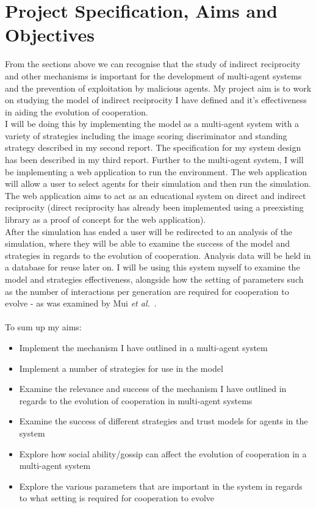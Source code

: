 \documentclass[]{final_report}
\begin{document}
\section{Project Specification, Aims and Objectives}
From the sections above we can recognise that the study of indirect reciprocity and other mechanisms is important for the development of multi-agent systems and the prevention of exploitation by malicious agents. My project aim is to work on studying the model of indirect reciprocity I have defined and it's effectiveness in aiding the evolution of cooperation.\\
I will be doing this by implementing the model as a multi-agent system with a variety of strategies including the image scoring discriminator and standing strategy described in my second report. The specification for my system design has been described in my third report. Further to the multi-agent system, I will be implementing a web application to run the environment. The web application will allow a user to select agents for their simulation and then run the simulation. The web application aims to act as an educational system on direct and indirect reciprocity (direct reciprocity has already been implemented using a preexisting library as a proof of concept for the web application).\\
After the simulation has ended a user will be redirected to an analysis of the simulation, where they will be able to examine the success of the model and strategies in regards to the evolution of cooperation. Analysis data will be held in a database for reuse later on. I will be using this system myself to examine the model and strategies effectiveness, alongside how the setting of parameters such as the number of interactions per generation are required for cooperation to evolve - as was examined by Mui \textit{et al.}~\cite{Mui:2002:NRM:544741.544807}.\\\\
To sum up my aims:
\begin{itemize}
	\item Implement the mechanism I have outlined in a multi-agent system
	\item Implement a number of strategies for use in the model
	\item Examine the relevance and success of the mechanism I have outlined in regards to the evolution of cooperation in multi-agent systems
	\item Examine the success of different strategies and trust models for agents in the system
	\item Explore how social ability/gossip can affect the evolution of cooperation in a multi-agent system
	\item Explore the various parameters that are important in the system in regards to what setting is required for cooperation to evolve
\end{itemize}
\end{document}
